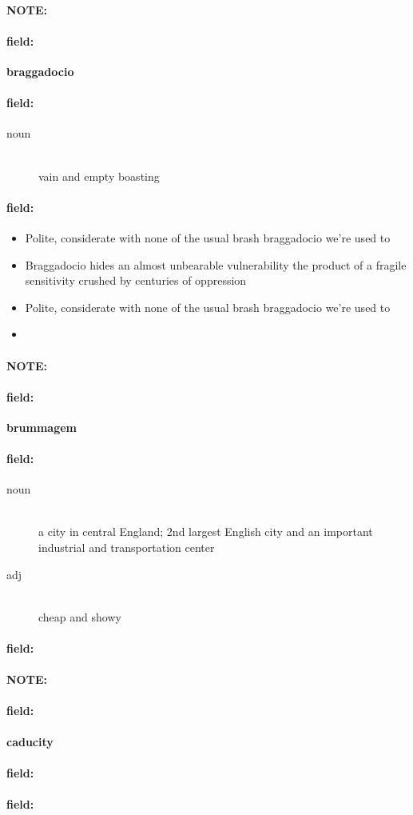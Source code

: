 \documentclass[12pt]{article}
\newenvironment{note}{\paragraph{NOTE:}}{}
\newenvironment{field}{\paragraph{field:}}{}
\begin{document}
\begin{note}
\begin{field}
\textbf{\large braggadocio}
\end{field}


\begin{field}
\begin{description}
\item[noun] \hfill \\ 
vain and empty boasting

\end{description}
\end{field}

\begin{field}
\begin{itemize}
\item Polite, considerate with none of the usual brash braggadocio we're used to
\item Braggadocio hides an almost unbearable vulnerability  the product of a fragile sensitivity crushed by centuries of oppression
\item Polite, considerate with none of the usual brash braggadocio we're used to
\item 
\end{itemize}
\end{field}
\end{note}
\begin{note}
\begin{field}
\textbf{\large brummagem}
\end{field}


\begin{field}
\begin{description}
\item[noun] \hfill \\ 
a city in central England; 2nd largest English city and an important industrial and transportation center

\item[adj] \hfill \\ 
cheap and showy

\end{description}
\end{field}

\begin{field}
\end{field}
\end{note}
\begin{note}
\begin{field}
\textbf{\large caducity}
\end{field}


\begin{field}
\end{field}

\begin{field}
\end{field}
\end{note}
\end{document}
